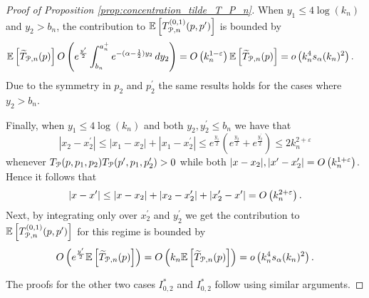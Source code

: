\begin{proof}[Proof of Proposition \ref{prop:concentration_tilde_T_P_n}]
When $y_1 \le 4\log(k_n)$ and $y_2 > b_n$, the contribution to $\mathbb{E}\left[T^{(0,1)}_{{\mathcal P},n}(p,p^\prime)\right]$ is bounded by
\begin{align*}
	\mathbb{E}\left[\widetilde{T}_{{\mathcal P},n}(p)\right]
		O\left(e^{\frac{y^\prime}{2}}\int_{b_n}^{a_n^+} e^{-(\alpha -\frac{1}{2})y_2} \, dy_2\right)
	&= O\left(k_n^{1 - \varepsilon}\right)\mathbb{E}\left[\widetilde{T}_{{\mathcal P},n}(p)\right]
	= o\left(k_n^4 s_\alpha(k_n)^2\right).
\end{align*}
Due to the symmetry in $p_2$ and $p_2^\prime$ the same results holds for the cases where $y_2 > b_n$.

Finally, when $y_1 \le 4\log(k_n)$ and both $y_2, y_2^\prime \le b_n$ we have that
\[
	|x_2 - x_2^\prime| \le |x_1 - x_2| + |x_1 - x_2^\prime| \le e^{\frac{y_1}{2}}\left(e^{\frac{y_2}{2}} + e^{\frac{y_2^\prime}{2}}\right) \le 2k_n^{2+\varepsilon}
\]
whenever $T_{{\mathcal P}}(p,p_1,p_2) T_{{\mathcal P}}(p^\prime,p_1,p_2^\prime) > 0$ while both $|x - x_2|, |x^\prime - x_2^\prime| = O\left(k_n^{1 + \varepsilon}\right)$. Hence it follows that
\[
	|x - x^\prime| \le |x - x_2| + |x_2 - x_2^\prime| + |x_2^\prime - x^\prime| = O\left(k_n^{2 + \varepsilon}\right).
\]
Next, by integrating only over $x_2^\prime$ and $y_2^\prime $ we get the contribution to $\mathbb{E}\left[T^{(0,1)}_{{\mathcal P},n}(p,p^\prime)\right]$ for this regime is bounded by
\[
	O\left(e^{\frac{y^\prime}{2}} \mathbb{E}\left[\widetilde{T}_{{\mathcal P},n}(p)\right]\right)
	= O\left(k_n \mathbb{E}\left[\widetilde{T}_{{\mathcal P},n}(p)\right]\right) = o\left(k_n^4 s_\alpha(k_n)^2\right).
\]

The proofs for the other two cases $I_{0,2}^\ast$ and $I_{0,2}^\ast$ follow using similar arguments.

%

\end{proof}

%
%
